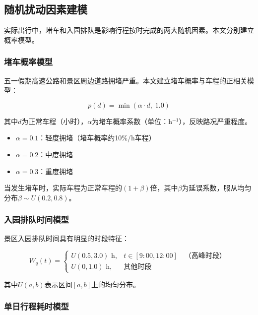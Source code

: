 \documentclass[12pt,a4paper]{ctexart}
\begin{document}
\subsection{随机扰动因素建模}

实际出行中，堵车和入园排队是影响行程按时完成的两大随机因素。本文分别建立概率模型。

\subsubsection{堵车概率模型}

五一假期高速公路和景区周边道路拥堵严重。本文建立堵车概率与车程的正相关模型：

\begin{equation}
\label{eq:congestion}
p(d) = \min(\alpha \cdot d, \; 1.0)
\end{equation}

其中$d$为正常车程（小时），$\alpha$为堵车概率系数（单位：h$^{-1}$），反映路况严重程度。

\begin{itemize}
    \item $\alpha = 0.1$：轻度拥堵（堵车概率约10\%/h车程）
    \item $\alpha = 0.2$：中度拥堵
    \item $\alpha = 0.3$：重度拥堵
\end{itemize}

当发生堵车时，实际车程为正常车程的$(1+\beta)$倍，其中$\beta$为延误系数，服从均匀分布$\beta \sim U(0.2, 0.8)$。

\subsubsection{入园排队时间模型}

景区入园排队时间具有明显的时段特征：

\begin{equation}
\label{eq:queue}
W_q(t) = \begin{cases}
U(0.5, 3.0) \text{ h}, & t \in [9:00, 12:00] \quad \text{（高峰时段）} \\
U(0, 1.0) \text{ h}, & \text{其他时段}
\end{cases}
\end{equation}

其中$U(a,b)$表示区间$[a,b]$上的均匀分布。

\subsubsection{单日行程耗时模型}
\end{document}
